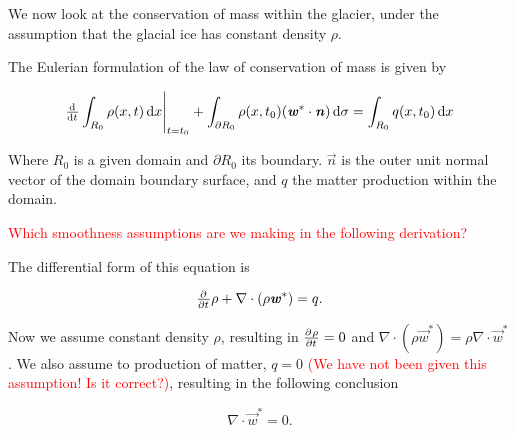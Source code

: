 We now look at the conservation of mass within the glacier, under the assumption that the glacial ice has constant density $\rho$.

The Eulerian formulation of the law of conservation of mass is given by

\begin{equation}
  \eval{\od{}{t} \int_{R_0} \rho(x, t) \dif{x}}_{t = t_0} + \int_{\partial R_0} \rho(x, t_0) (\vec{w}^* \cdot \vec{n}) \dif{\sigma} = \int_{R_0} q(x, t_0) \dif{x}
\end{equation}

Where $R_0$ is a given domain and $\partial R_0$ its boundary. $\vec{n}$ is the outer unit normal vector of the domain boundary surface, and $q$ the matter production within the domain.

\textcolor{red}{Which smoothness assumptions are we making in the following derivation?}

The differential form of this equation is

\begin{equation}
  \pd{}{t} \rho + \nabla \cdot (\rho \vec{w}^*) = q.
\end{equation}

Now we assume constant density $\rho$, resulting in $\pd{\rho}{t} = 0$ and $\nabla \cdot (\rho \vec{w}^*) = \rho \nabla \cdot \vec{w}^*$. We also assume to production of matter, $q = 0$ \textcolor{red}{(We have not been given this assumption! Is it correct?)}, resulting in the following conclusion

\begin{equation}
  \nabla \cdot \vec{w}^* = 0.
\end{equation}
